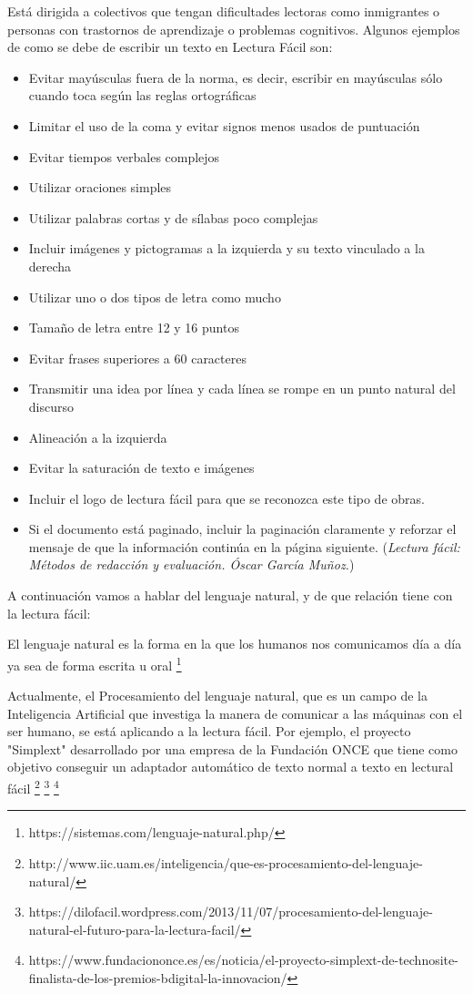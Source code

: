 Está dirigida a colectivos que tengan dificultades lectoras como inmigrantes o personas con trastornos de aprendizaje o problemas cognitivos.
Algunos ejemplos de como se debe de escribir un texto en Lectura Fácil son:
\begin{itemize}
	\item Evitar mayúsculas fuera de la norma, es decir, escribir en mayúsculas sólo cuando toca según las reglas ortográficas
	\item Limitar el uso de la coma y evitar signos menos usados de puntuación
	\item Evitar tiempos verbales complejos
	\item Utilizar oraciones simples
	\item Utilizar palabras cortas y de sílabas poco complejas
	\item Incluir imágenes y pictogramas a la izquierda y su texto vinculado a la derecha
	\item Utilizar uno o dos tipos de letra como mucho
	\item Tamaño de letra entre 12 y 16 puntos
	\item Evitar frases superiores a 60 caracteres
	\item Transmitir una idea por línea y cada línea se rompe en un punto natural del discurso
	\item Alineación a la izquierda
	\item Evitar la saturación de texto e imágenes
	\item Incluir el logo de lectura fácil para que se reconozca este tipo de obras. 
	\item Si el documento está paginado, incluir la paginación claramente y reforzar el mensaje de que la información continúa en la página siguiente.
	(\textit {Lectura fácil: Métodos de redacción y evaluación.  Óscar García Muñoz.})	
\end{itemize}

A continuación vamos a hablar del lenguaje natural, y de que relación tiene con la lectura fácil:

El lenguaje natural es la forma en la que los humanos nos comunicamos día a día ya sea de forma escrita u oral
\footnote{https://sistemas.com/lenguaje-natural.php/}

Actualmente, el Procesamiento del lenguaje natural, que es un campo de la Inteligencia Artificial que investiga la manera de comunicar a las máquinas con el ser humano, se está aplicando a la lectura fácil. Por ejemplo, el proyecto "Simplext" desarrollado por una empresa de la Fundación ONCE que tiene como objetivo conseguir un adaptador automático de texto normal a texto en lectural fácil
\footnote{http://www.iic.uam.es/inteligencia/que-es-procesamiento-del-lenguaje-natural/}
\footnote{https://dilofacil.wordpress.com/2013/11/07/procesamiento-del-lenguaje-natural-el-futuro-para-la-lectura-facil/}
\footnote{https://www.fundaciononce.es/es/noticia/el-proyecto-simplext-de-technosite-finalista-de-los-premios-bdigital-la-innovacion/}


